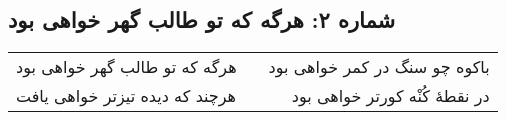 \begin{center}
\section*{شماره ۲: هرگه که تو طالب گهر خواهی بود}
\label{sec:002}
\begin{longtable}{l p{0.5cm} r}
هرگه که تو طالب گهر خواهی بود
&&
باکوه چو سنگ در کمر خواهی بود
\\
هرچند که دیده تیزتر خواهی یافت
&&
در نقطهٔ کُنْه کورتر خواهی بود
\\
\end{longtable}
\end{center}
